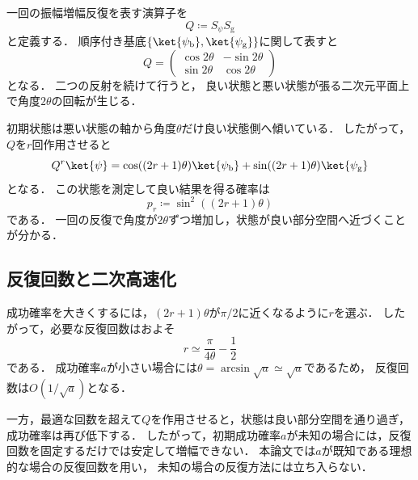 一回の振幅増幅反復を表す演算子を
\begin{equation}
  Q
  \coloneq
  S_{\psi}S_{\mathrm{g}}
  \label{eq:amplitude-amplification-operator}
\end{equation}
と定義する．
順序付き基底$\{\ket{\psi_{\mathrm{b}}},\ket{\psi_{\mathrm{g}}}\}$に関して表すと
\begin{equation}
  Q
  =
  \begin{pmatrix}
    \cos 2\theta & -\sin 2\theta\\
    \sin 2\theta & \cos 2\theta
  \end{pmatrix}
  \label{eq:amplitude-amplification-rotation-matrix}
\end{equation}
となる．
二つの反射を続けて行うと，
良い状態と悪い状態が張る二次元平面上で角度$2\theta$の回転が生じる\cite{shimada2020}．

初期状態は悪い状態の軸から角度$\theta$だけ良い状態側へ傾いている．
したがって，$Q$を$r$回作用させると
\begin{equation}
  Q^r\ket{\psi}
  =
  \cos((2r+1)\theta)\ket{\psi_{\mathrm{b}}}
  +\sin((2r+1)\theta)\ket{\psi_{\mathrm{g}}}
  \label{eq:amplitude-after-r-iterations}
\end{equation}
となる．
この状態を測定して良い結果を得る確率は
\begin{equation}
  p_r
  \coloneq
  \sin^2((2r+1)\theta)
  \label{eq:amplified-success-probability}
\end{equation}
である．
一回の反復で角度が$2\theta$ずつ増加し，状態が良い部分空間へ近づくことが分かる．

\subsection{反復回数と二次高速化}
\label{subsec:amplification-iteration-count}

成功確率を大きくするには，$(2r+1)\theta$が$\pi/2$に近くなるように$r$を選ぶ．
したがって，必要な反復回数はおよそ
\begin{equation}
  r
  \simeq
  \frac{\pi}{4\theta}-\frac{1}{2}
  \label{eq:near-optimal-amplification-count}
\end{equation}
である．
成功確率$a$が小さい場合には$\theta=\arcsin\sqrt{a}\simeq\sqrt{a}$であるため，
反復回数は$O(1/\sqrt{a})$となる．

一方，最適な回数を超えて$Q$を作用させると，状態は良い部分空間を通り過ぎ，
成功確率は再び低下する．
したがって，初期成功確率$a$が未知の場合には，反復回数を固定するだけでは安定して増幅できない．
本論文では$a$が既知である理想的な場合の反復回数を用い，
未知の場合の反復方法には立ち入らない．
